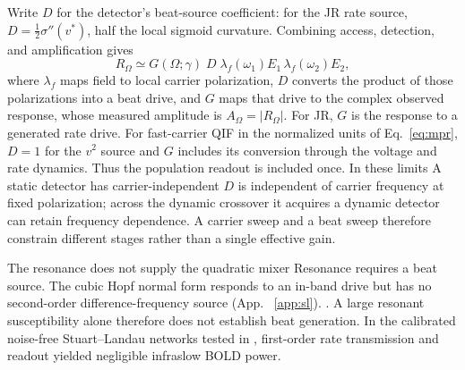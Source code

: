 \documentclass[11pt,a4paper]{article}
\newcommand{\Sig}{\sigma}
\newcommand{\half}{\tfrac{1}{2}}
\providecommand{\DIFaddtex}[1]{{\protect\color{blue} \sf #1}} %
\providecommand{\DIFdeltex}[1]{{\protect\color{red} \scriptsize #1}} %
\providecommand{\DIFaddbegin}{} %
\providecommand{\DIFaddend}{} %
\providecommand{\DIFdelbegin}{} %
\providecommand{\DIFdelend}{} %
\providecommand{\DIFadd}[1]{\texorpdfstring{\DIFaddtex{#1}}{#1}} %
\providecommand{\DIFdel}[1]{\texorpdfstring{\DIFdeltex{#1}}{}} %
\begin{document}
Write $D$ for the detector's beat-source coefficient: for the JR rate source,
$D=\half\Sig''(v^*)$, half the local sigmoid curvature. Combining access,
detection, and amplification gives
\begin{equation}
R_\Omega\simeq G(\Omega;\gamma)\;D\;\lambda_f(\omega_1)E_1\,\lambda_f(\omega_2)E_2 ,
\label{eq:receiver}
\end{equation}
\DIFaddbegin \makeatletter\begingroup\edef\@currentlabel{\theequation}\label{eq:spatial}\endgroup\makeatother
\DIFaddend where $\lambda_f$ maps field to local carrier polarization, $D$ converts the
product of those polarizations into a beat drive, and $G$ maps that drive to the
complex observed response, whose measured amplitude is $A_\Omega=|R_\Omega|$.
For JR, $G$ is the response to a generated rate drive.
\DIFdelbegin \DIFdel{For fast-carrier QIF in the normalized units of Eq.~\eqref{eq:mpr}, $D=1$ for
the $v^2$ source and $G$ includes its conversion through the voltage and rate
dynamics. Thus the population readout is included once. In these limits }\DIFdelend \DIFaddbegin \DIFadd{A static detector has carrier-independent }\DIFaddend $D$ \DIFdelbegin \DIFdel{is
independent of carrier frequency }\DIFdelend at fixed polarization;
\DIFdelbegin \DIFdel{across the dynamic crossover it acquires }\DIFdelend \DIFaddbegin \DIFadd{a dynamic detector can retain }\DIFaddend frequency dependence. A carrier sweep and a beat sweep
therefore constrain different stages rather than a single effective gain.

\DIFdelbegin \DIFdel{The resonance does not supply the quadratic mixer}\DIFdelend \DIFaddbegin \DIFadd{Resonance requires a beat source}\DIFaddend . The cubic Hopf normal form
responds to an in-band drive but has no second-order difference-frequency source\DIFdelbegin \DIFdel{(App. ~\ref{app:sl}). }\DIFdelend \DIFaddbegin \DIFadd{. }\DIFaddend A large resonant susceptibility alone therefore does not
establish beat generation.
\DIFaddbegin \DIFadd{In the calibrated noise-free Stuart--Landau networks tested in \cite{Ruffini2026iso},
first-order rate transmission and readout yielded negligible infraslow BOLD power.
}\DIFaddend
\end{document}
